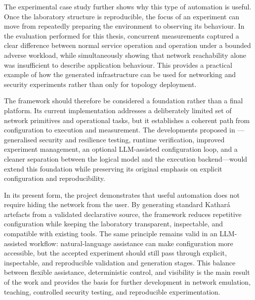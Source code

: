 The experimental case study further shows why this type of automation is useful.
Once the laboratory structure is reproducible, the focus of an experiment can
move from repeatedly preparing the environment to observing its behaviour. In
the evaluation performed for this thesis, concurrent measurements captured a
clear difference between normal service operation and operation under a bounded
adverse workload, while simultaneously showing that network reachability alone
was insufficient to describe application behaviour. This provides a practical
example of how the generated infrastructure can be used for networking and
security experiments rather than only for topology deployment.

The framework should therefore be considered a foundation rather than a final
platform. Its current implementation addresses a deliberately limited set of
network primitives and operational tasks, but it establishes a coherent path
from configuration to execution and measurement. The developments proposed in
---generalised security and resilience testing,
runtime verification, improved experiment management, an optional LLM-assisted
configuration loop, and a cleaner separation between the logical model and the
execution backend---would extend this foundation while preserving its original
emphasis on explicit configuration and reproducibility.

In its present form, the project demonstrates that useful automation does not
require hiding the network from the user. By generating standard Kathar\'a
artefacts from a validated declarative source, the framework reduces repetitive
configuration while keeping the laboratory transparent, inspectable, and
compatible with existing tools. The same principle remains valid in an
LLM-assisted workflow: natural-language assistance can make configuration more
accessible, but the accepted experiment should still pass through explicit,
inspectable, and reproducible validation and generation stages. This balance
between flexible assistance, deterministic control, and visibility is the main
result of the work and provides the basis for further development in network
emulation, teaching, controlled security testing, and reproducible
experimentation.
